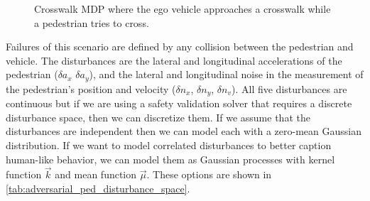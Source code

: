 \begin{figure}
    \centering
    \caption{Crosswalk MDP where the ego vehicle approaches a crosswalk while a pedestrian tries to cross. }
    \label{fig:pedestrian_crosswalk}
\end{figure}


Failures of this scenario are defined by any collision between the pedestrian and vehicle. The disturbances are the lateral and longitudinal accelerations of the pedestrian ($\delta a_x$ $\delta a_y$), and the lateral and longitudinal noise in the measurement of the pedestrian's position and velocity ($\delta n_x$, $\delta n_y$, $\delta n_v$). All five disturbances are continuous but if we are using a safety validation solver that requires a discrete disturbance space, then we can discretize them. If we assume that the disturbances are independent then we can model each with a zero-mean Gaussian distribution. If we want to model correlated disturbances to better caption human-like behavior, we can model them as Gaussian processes with kernel function $\vec{k}$ and mean function $\vec{\mu}$. These options are shown in \cref{tab:adversarial_ped_disturbance_space}.


